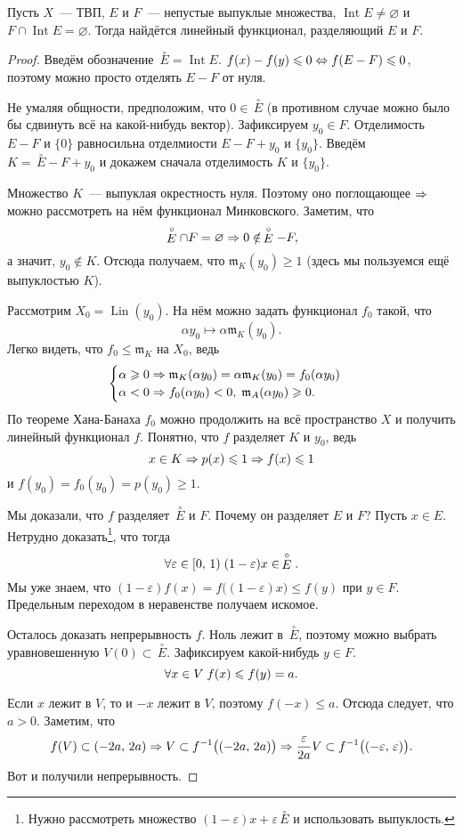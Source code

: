\documentclass{notes}
\DeclareMathOperator{\Int}{Int}
\DeclareMathOperator{\Lin}{Lin}
\newcommand{\mink}{\mathfrak{m}}
\newcommand{\cint}[1]{\,\stackrel{\circ}{#1}}
\begin{document}
	\begin{thm} \label{thm:sep1}
		Пусть $X$~--- ТВП, $E$ и $F$~--- непустые выпуклые множества, $\Int E \neq \varnothing$ и $F \cap \Int E = \varnothing$. Тогда найдётся  линейный функционал, разделяющий $E$ и $F$.
		\begin{proof}
			Введём обозначение $\cint E = \Int E$. $f(x) - f(y) \leqslant 0 \Leftrightarrow f(E - F) \leqslant 0$, поэтому можно просто отделять $E - F$ от нуля.

			Не умаляя общности, предположим, что $0 \in \cint{E}$ (в противном случае можно было бы сдвинуть всё на какой-нибудь вектор). Зафиксируем $y_0 \in F$. Отделимость $E - F$ и $\{0\}$ равносильна отделмиости $E - F + y_0$ и $\{y_0\}$. Введём $K = \cint{E} - F + y_0$ и докажем сначала отделимость $K$ и $\{y_0\}$.

			Множество $K$~--- выпуклая окрестность нуля. Поэтому оно поглощающее $\Rightarrow$ можно рассмотреть на нём функционал Минковского. Заметим, что 
			\[
				\cint{E} \cap F = \varnothing \so 0 \notin  \cint{E} - F,
			\]
			а значит, $y_0 \notin K$. Отсюда получаем, что $\mink_K(y_0) \geqslant 1$ (здесь мы пользуемся ещё выпуклостью $K$). 

			Рассмотрим $X_0 = \Lin(y_0)$. На нём можно задать функционал $f_0$ такой, что
			\[
				\alpha y_0 \mapsto \alpha \mink_K (y_0).
			\]
			Легко видеть, что $f_0 \leqslant \mink_K$ на $X_0$, ведь
			\[
				\begin{cases}
					\alpha \geqslant 0 \so \mink_K(\alpha y_0) = \alpha \mink_K(y_0) = f_0(\alpha y_0) \\
					\alpha < 0 \so f_0(\alpha y_0) < 0, \; \mink_A(\alpha y_0) \geqslant 0.
				\end{cases}
			\]
			По теореме Хана-Банаха $f_0$ можно продолжить на всё пространство $X$ и получить линейный функционал $f$. Понятно, что $f$ разделяет $K$ и $y_0$, ведь
			\[
				x \in K \Rightarrow p(x) \leqslant 1 \Rightarrow f(x) \leqslant 1
			\]
			и $f(y_0) = f_0(y_0) = p(y_0) \geqslant 1$.

			Мы доказали, что $f$ разделяет $\cint{E}$ и $F$. Почему он разделяет $E$ и $F$? Пусть $x \in E$. Нетрудно доказать\footnote{Нужно рассмотреть множество $(1 - \varepsilon)x + \varepsilon \cint{E}$ и использовать выпуклость.}, что тогда\[
				\all \varepsilon \in [0, \, 1) \; (1 - \varepsilon)x \in \cint{E}.
			\]
			Мы уже знаем, что $(1 - \varepsilon) f(x) = f\big((1 - \varepsilon)x\big) \leqslant f(y)$ при $y \in F$. Предельным переходом в неравенстве получаем искомое.

			Осталось доказать непрерывность $f$. Ноль лежит в $\cint{E}$, поэтому можно выбрать уравновешенную $V(0) \subset \cint{E}$. Зафиксируем какой-нибудь $y \in F$.
			\[
				\forall x \in V \; f(x) \leqslant f(y) = a.
			\]

			Если $x$ лежит в $V$, то и $-x$ лежит в $V$, поэтому $f(-x) \leqslant a$. Отсюда следует, что $a > 0$.
			Заметим, что
			\[
				f(V) \subset (-2a, \, 2a) \Rightarrow V \subset f^{-1}\big((-2a, \, 2a)\big) \Rightarrow \dfrac{\varepsilon}{2a} V \subset f^{-1} \big((-\varepsilon, \, \varepsilon)\big).
			\]
			Вот и получили непрерывность.

		\end{proof}
	\end{thm}
\end{document}
